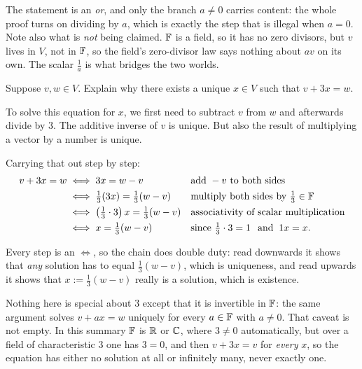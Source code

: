 \begin{ainote}
  The statement is an \emph{or}, and only the branch $a \neq 0$ carries content: the whole proof turns on dividing by $a$, which is exactly the step that is illegal when $a = 0$. Note also what is \emph{not} being claimed. $\mathbb{F}$ is a field, so it has no zero divisors, but $v$ lives in $V$, not in $\mathbb{F}$, so the field's zero-divisor law says nothing about $av$ on its own. The scalar $\tfrac{1}{a}$ is what bridges the two worlds.
\end{ainote}

\begin{xrcs}
  Suppose $v,w \in V$. Explain why there exists a unique $x \in V$ such that $v + 3x = w$.

  \begin{xsol}
    To solve this equation for $x$, we first need to subtract $v$ from $w$ and afterwards divide by $3$. The additive inverse of $v$ is unique. But also the result of multiplying a vector by a number is unique.

    Carrying that out step by step:
    \[
      \begin{aligned}
        v + 3x = w
        &\iff 3x = w - v
        &&\text{add } -v \text{ to both sides} \\
        &\iff \tfrac{1}{3}(3x) = \tfrac{1}{3}(w-v)
        &&\text{multiply both sides by } \tfrac{1}{3} \in \mathbb{F} \\
        &\iff \left(\tfrac{1}{3} \cdot 3\right) x = \tfrac{1}{3}(w-v)
        &&\text{associativity of scalar multiplication} \\
        &\iff x = \tfrac{1}{3}(w-v)
        &&\text{since } \tfrac{1}{3} \cdot 3 = 1 \;\;\, \text{and}\;\; 1x = x.
      \end{aligned}
    \]

    Every step is an $\iff$, so the chain does double duty: read downwards it shows that \emph{any} solution has to equal $\tfrac{1}{3}(w-v)$, which is uniqueness, and read upwards it shows that $x := \tfrac{1}{3}(w-v)$ really is a solution, which is existence.
  \end{xsol}
\end{xrcs}

\begin{ainote}
  Nothing here is special about $3$ except that it is invertible in $\mathbb{F}$: the same argument solves $v + ax = w$ uniquely for every $a \in \mathbb{F}$ with $a \neq 0$. That caveat is not empty. In this summary $\mathbb{F}$ is $\mathbb{R}$ or $\mathbb{C}$, where $3 \neq 0$ automatically, but over a field of characteristic $3$ one has $3 = 0$, and then $v + 3x = v$ for \emph{every} $x$, so the equation has either no solution at all or infinitely many, never exactly one.
\end{ainote}

